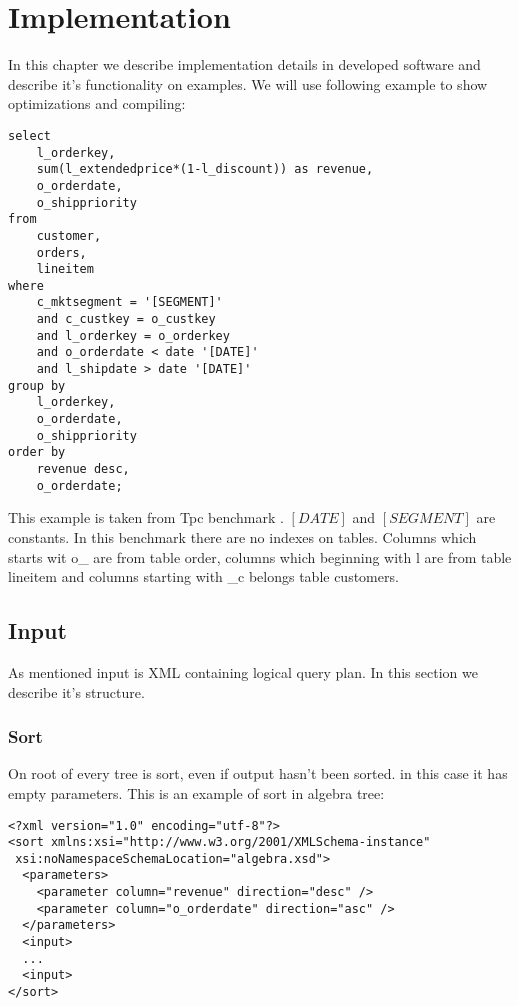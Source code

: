\chapter{Implementation}

In this chapter we describe implementation details in developed software and describe it's functionality on examples. We will use following example to show optimizations and compiling:


\begin{verbatim}
select
    l_orderkey,
    sum(l_extendedprice*(1-l_discount)) as revenue,
    o_orderdate,
    o_shippriority
from
    customer,
    orders,
    lineitem
where
    c_mktsegment = '[SEGMENT]'
    and c_custkey = o_custkey
    and l_orderkey = o_orderkey
    and o_orderdate < date '[DATE]'
    and l_shipdate > date '[DATE]'
group by
    l_orderkey,
    o_orderdate,
    o_shippriority
order by
    revenue desc,
    o_orderdate;
\end{verbatim}

This example is taken from Tpc benchmark \cite{benchmark}. $[DATE]$ and $[SEGMENT]$ are constants. In this benchmark there are no indexes on tables. Columns which starts wit o\_ are from table order, columns which beginning with l\- are from table lineitem and columns starting with \_c belongs table customers.



\section{Input}

As mentioned input is XML containing logical query plan. In this section we describe it's structure. 

\subsection{Sort}

On root of every tree is sort, even if output hasn't been sorted. in this case it has empty parameters. This is an example of sort in algebra tree:


\begin{lstlisting}
<?xml version="1.0" encoding="utf-8"?>
<sort xmlns:xsi="http://www.w3.org/2001/XMLSchema-instance"
 xsi:noNamespaceSchemaLocation="algebra.xsd">
  <parameters>
    <parameter column="revenue" direction="desc" />
    <parameter column="o_orderdate" direction="asc" />
  </parameters>
  <input>
  ...
  <input>
</sort>
\end{lstlisting}

